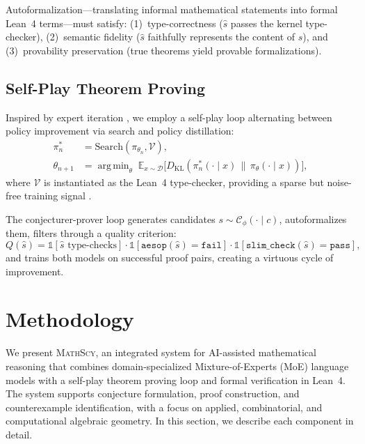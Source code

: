 \documentclass[11pt,a4paper]{article}
\newcommand{\mathscy}{\textsc{MathScy}}
\newcommand{\E}{\mathbb{E}}
\DeclareMathOperator*{\argmin}{arg\,min}
\begin{document}
Autoformalization---translating informal mathematical statements into formal Lean~4 terms---must satisfy: (1)~type-correctness ($\hat{s}$ passes the kernel type-checker), (2)~semantic fidelity ($\hat{s}$ faithfully represents the content of $s$), and (3)~provability preservation (true theorems yield provable formalizations).

\subsection{Self-Play Theorem Proving}

Inspired by expert iteration \citep{anthony2017thinking, silver2017mastering}, we employ a self-play loop alternating between policy improvement via search and policy distillation:
\begin{align}
    \pi^*_n &= \mathrm{Search}(\pi_{\theta_n}, \mathcal{V}), \label{eq:expert_iter_search} \\
    \theta_{n+1} &= \argmin_\theta\; \E_{x \sim \mathcal{D}} \bigl[ D_{\mathrm{KL}}(\pi^*_n(\cdot \mid x) \,\|\, \pi_\theta(\cdot \mid x)) \bigr], \label{eq:expert_iter_distill}
\end{align}
where $\mathcal{V}$ is instantiated as the Lean~4 type-checker, providing a sparse but noise-free training signal \citep{polu2023formal}.

The conjecturer-prover loop generates candidates $s \sim \mathcal{C}_\phi(\cdot \mid c)$, autoformalizes them, filters through a quality criterion:
\begin{equation}\label{eq:quality_filter}
    Q(\hat{s}) = \mathbb{1}[\hat{s} \text{ type-checks}] \cdot \mathbb{1}[\texttt{aesop}(\hat{s}) = \texttt{fail}] \cdot \mathbb{1}[\texttt{slim\_check}(\hat{s}) = \texttt{pass}],
\end{equation}
and trains both models on successful proof pairs, creating a virtuous cycle of improvement.


\section{Methodology}
\label{sec:methodology}

We present \mathscy{}, an integrated system for AI-assisted mathematical reasoning that combines domain-specialized Mixture-of-Experts (MoE) language models with a self-play theorem proving loop and formal verification in Lean~4. The system supports conjecture formulation, proof construction, and counterexample identification, with a focus on applied, combinatorial, and computational algebraic geometry. In this section, we describe each component in detail.
\end{document}
